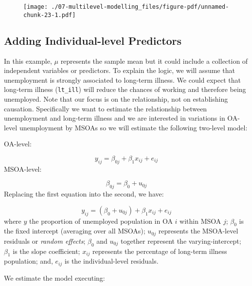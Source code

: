 \documentclass[
  letterpaper,
  krantz2]{style/krantz}
\newenvironment{Shaded}{\begin{snugshade}}{\end{snugshade}}
\newcommand{\AttributeTok}[1]{\textcolor[rgb]{0.40,0.45,0.13}{#1}}
\newcommand{\CommentTok}[1]{\textcolor[rgb]{0.37,0.37,0.37}{#1}}
\newcommand{\DecValTok}[1]{\textcolor[rgb]{0.68,0.00,0.00}{#1}}
\newcommand{\FunctionTok}[1]{\textcolor[rgb]{0.28,0.35,0.67}{#1}}
\newcommand{\NormalTok}[1]{\textcolor[rgb]{0.00,0.23,0.31}{#1}}
\newcommand{\OtherTok}[1]{\textcolor[rgb]{0.00,0.23,0.31}{#1}}
\newcommand{\SpecialCharTok}[1]{\textcolor[rgb]{0.37,0.37,0.37}{#1}}
\begin{document}
\begin{figure}[H]

{\centering \texttt{[image: ./07-multilevel-modelling\_files/figure-pdf/unnamed-chunk-23-1.pdf]}

}

\end{figure}

\hypertarget{sec-indlevel}{%
\subsection{Adding Individual-level Predictors}\label{sec-indlevel}}

In this example, \(\mu\) represents the sample mean but it could include
a collection of independent variables or predictors. To explain the
logic, we will assume that unemployment is strongly associated to
long-term illness. We could expect that long-term illness
(\texttt{lt\_ill}) will reduce the chances of working and therefore
being unemployed. Note that our focus is on the relationship, not on
establishing causation. Specifically we want to estimate the
relationship between unemployment and long-term illness and we are
interested in variations in OA-level unemployment by MSOAs so we will
estimate the following two-level model:

OA-level:

\[y_{ij} = \beta_{0j} + \beta_{1}x_{ij} + e_{ij}\] MSOA-level:

\[\beta_{0j} = \beta_{0} + u_{0j}\] Replacing the first equation into
the second, we have:

\[y_{ij} = (\beta_{0} + u_{0j}) + \beta_{1}x_{ij} + e_{ij}\] where \(y\)
the proportion of unemployed population in OA \(i\) within MSOA \(j\);
\(\beta_{0}\) is the fixed intercept (averaging over all MSOAs);
\(u_{0j}\) represents the MSOA-level residuals or \emph{random effects};
\(\beta_{0}\) and \(u_{0j}\) together represent the varying-intercept;
\(\beta_{1}\) is the slope coefficient; \(x_{ij}\) represents the
percentage of long-term illness population; and, \(e_{ij}\) is the
individual-level residuals.

We estimate the model executing:

\begin{Shaded}
\end{Shaded}
\end{document}
